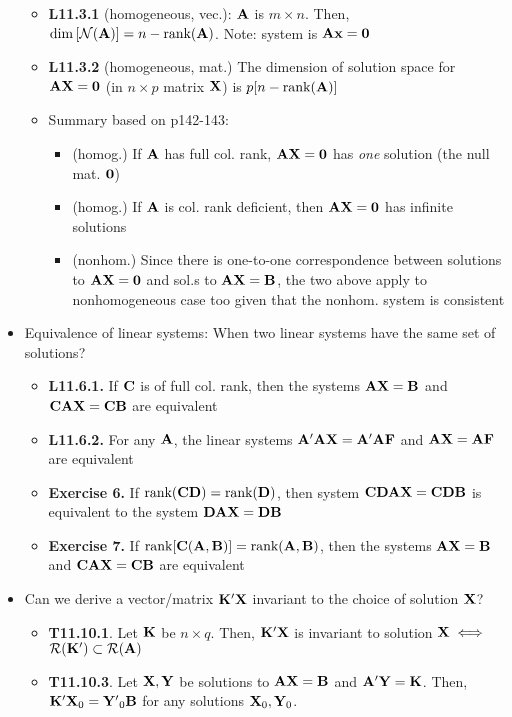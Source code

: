 \documentclass[a4paper, oneside]{book}
\begin{document}
\begin{itemize}
\begin{itemize}
	\item \textbf{L11.3.1} (homogeneous, vec.): $\mathbf{A}$ is $m\times n$. Then, $\dim\left[\mathcal{N}(\mathbf{A})\right]=n-\text{rank}(\mathbf{A})$. Note: system is $\mathbf{Ax=0}$
	\item \textbf{L11.3.2} (homogeneous, mat.) The dimension of solution space for $\mathbf{AX=0}$ (in $n\times p$ matrix $\mathbf{X}$) is $p[n-\text{rank}(\mathbf{A})]$
	\item Summary based on p142-143:
		\begin{itemize}
		\item (homog.) If $\mathbf{A}$ has full col. rank, $\mathbf{AX}=\mathbf{0}$ has \textit{one} solution (\ie the null mat. $\mathbf{0}$)
		\item (homog.) If $\mathbf{A}$ is col. rank deficient, then $\mathbf{AX}=\mathbf 0$ has infinite solutions
		\item (nonhom.) Since there is one-to-one correspondence between solutions to $\mathbf{AX=0}$ and sol.s to $\mathbf{AX=B}$, the two above apply to nonhomogeneous case too given that the nonhom. system is consistent
		\end{itemize}
	\end{itemize}
\item Equivalence of linear systems: When two linear systems have the same set of solutions?
	\begin{itemize}
	\item \textbf{L11.6.1.} If $\mathbf{C}$ is of full col. rank, then the systems $\mathbf{AX=B}$ and $\mathbf{CAX=CB}$ are equivalent
	\item \textbf{L11.6.2.} For any $\mathbf{A}$, the linear systems $\mathbf{A'AX=A'AF}$ and $\mathbf{AX=AF}$ are equivalent
	\item \textbf{Exercise 6.} If $\text{rank}(\mathbf{CD})=\text{rank}(\mathbf{D})$, then system $\mathbf{CDAX}=\mathbf{CDB}$ is equivalent to the system $\mathbf{DAX}=\mathbf{DB}$
	\item \textbf{Exercise 7.} If $\text{rank}[\mathbf{C(A,B)}]=\text{rank}(\mathbf{A,B})$, then the systems $\mathbf{AX=B}$ and $\mathbf{CAX=CB}$ are equivalent
	\end{itemize}
\item Can we derive a vector/matrix $\mathbf{K'X}$ invariant to the choice of solution $\mathbf{X}$?
	\begin{itemize}
	\item \textbf{T11.10.1}. Let $\mathbf{K}$ be $n\times q$. Then, $\mathbf{K'X}$ is invariant to solution $\mathbf{X} \iff$ $\mathcal{R}(\mathbf{K}') \subset \mathcal{R}(\mathbf{A})$
	\item \textbf{T11.10.3}. Let $\mathbf{X,Y}$ be solutions to $\mathbf{AX=B}$ and $\mathbf{A'Y=K}$. Then, $\mathbf{K'X}_0=\mathbf{Y'}_0\mathbf{B}$ for any solutions $\mathbf{X}_0,\mathbf{Y}_0$.

\end{itemize}
\end{itemize}
\end{document}
